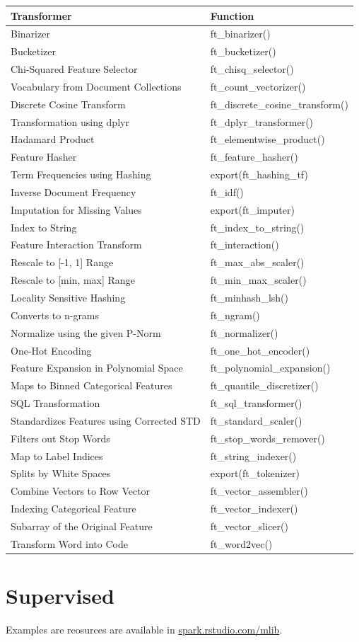\documentclass[]{book}
\theoremstyle{definition}
\theoremstyle{definition}
\theoremstyle{definition}
\theoremstyle{remark}
\begin{document}
\begin{longtable}[]{@{}ll@{}}
\toprule
Transformer & Function\tabularnewline
\midrule
\endhead
Binarizer & ft\_binarizer()\tabularnewline
Bucketizer & ft\_bucketizer()\tabularnewline
Chi-Squared Feature Selector & ft\_chisq\_selector()\tabularnewline
Vocabulary from Document Collections &
ft\_count\_vectorizer()\tabularnewline
Discrete Cosine Transform &
ft\_discrete\_cosine\_transform()\tabularnewline
Transformation using dplyr & ft\_dplyr\_transformer()\tabularnewline
Hadamard Product & ft\_elementwise\_product()\tabularnewline
Feature Hasher & ft\_feature\_hasher()\tabularnewline
Term Frequencies using Hashing & export(ft\_hashing\_tf)\tabularnewline
Inverse Document Frequency & ft\_idf()\tabularnewline
Imputation for Missing Values & export(ft\_imputer)\tabularnewline
Index to String & ft\_index\_to\_string()\tabularnewline
Feature Interaction Transform & ft\_interaction()\tabularnewline
Rescale to {[}-1, 1{]} Range & ft\_max\_abs\_scaler()\tabularnewline
Rescale to {[}min, max{]} Range & ft\_min\_max\_scaler()\tabularnewline
Locality Sensitive Hashing & ft\_minhash\_lsh()\tabularnewline
Converts to n-grams & ft\_ngram()\tabularnewline
Normalize using the given P-Norm & ft\_normalizer()\tabularnewline
One-Hot Encoding & ft\_one\_hot\_encoder()\tabularnewline
Feature Expansion in Polynomial Space &
ft\_polynomial\_expansion()\tabularnewline
Maps to Binned Categorical Features &
ft\_quantile\_discretizer()\tabularnewline
SQL Transformation & ft\_sql\_transformer()\tabularnewline
Standardizes Features using Corrected STD &
ft\_standard\_scaler()\tabularnewline
Filters out Stop Words & ft\_stop\_words\_remover()\tabularnewline
Map to Label Indices & ft\_string\_indexer()\tabularnewline
Splits by White Spaces & export(ft\_tokenizer)\tabularnewline
Combine Vectors to Row Vector & ft\_vector\_assembler()\tabularnewline
Indexing Categorical Feature & ft\_vector\_indexer()\tabularnewline
Subarray of the Original Feature & ft\_vector\_slicer()\tabularnewline
Transform Word into Code & ft\_word2vec()\tabularnewline
\bottomrule
\end{longtable}

\hypertarget{supervised}{%
\section{Supervised}\label{supervised}}

Examples are reosurces are available in
\href{http://spark.rstudio.com/mlib/}{spark.rstudio.com/mlib}.
\end{document}

